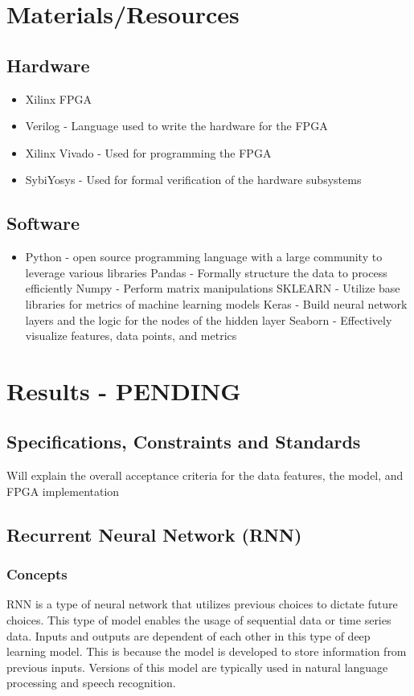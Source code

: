 \documentclass[12pt,titlepage]{article}
\begin{document}
\section{Materials/Resources}
\subsection{Hardware}
\begin{itemize}
	\item Xilinx FPGA
	\item Verilog - Language used to write the hardware for the FPGA
	\item Xilinx Vivado - Used for programming the FPGA
	\item SybiYosys - Used for formal verification of the hardware subsystems
\end{itemize}	

\subsection{Software}
\begin{itemize}
	\item Python - open source programming language with a large community to leverage various libraries
		\subitem Pandas - Formally structure the data to process efficiently
		\subitem Numpy - Perform matrix manipulations 
		\subitem SKLEARN - Utilize base libraries for metrics of machine learning models
		\subitem Keras - Build neural network layers and the logic for the nodes of the hidden layer
		\subitem Seaborn - Effectively visualize features, data points, and metrics
\end{itemize}	

\section{Results - PENDING}
\subsection{Specifications, Constraints and Standards}
Will explain the overall acceptance criteria for the data features, the model, and FPGA implementation
\subsection{Recurrent Neural Network (RNN)}
\subsubsection{Concepts}
RNN is a type of neural network that utilizes previous choices to dictate future choices. This type of model enables the usage of sequential data or time series data. Inputs and outputs are dependent of each other in this type of deep learning model. This is because the model is developed to store information from previous inputs. Versions of this model are typically used in natural language processing and speech recognition. 
\end{document}
